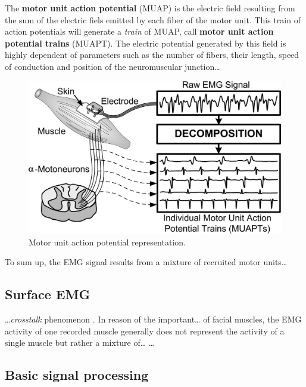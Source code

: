 \documentclass[a4paper,12pt,oneside,oldfontcommands]{memoir}
\begin{document}
The \textbf{motor unit action potential} (MUAP) is the electric field
resulting from the sum of the electric fiels emitted by each fiber of
the motor unit. This train of action potentials will generate a
\emph{train} of MUAP, call \textbf{motor unit action potential trains}
(MUAPT). The electric potential generated by this field is highly
dependent of parameters such as the number of fibers, their length,
speed of conduction and position of the neuromuscular junction\ldots{}

\begin{figure}[H]

{\centering \includegraphics[width=1\linewidth]{assets/muap} 

}

\caption{Motor unit action potential representation.}\label{fig:unnamed-chunk-1}
\end{figure}

To sum up, the EMG signal results from a mixture of recruited motor
units\ldots{}

\subsection{Surface EMG}\label{surface-emg}

\ldots{}\emph{crosstalk} phenomenon \citep{de_luca_use_1997}. In reason
of the important\ldots{} of facial muscles, the EMG activity of one
recorded muscle generally does not represent the activity of a single
muscle but rather a mixture of\ldots{} \citet{Rapin2011}\ldots{}

\subsection{Basic signal processing}\label{basic-signal-processing}
\end{document}
